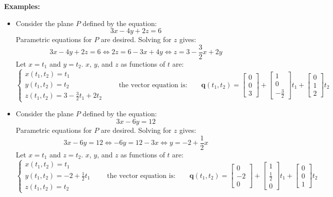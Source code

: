 \documentclass{article}
\begin{document}
\textbf{Examples:}
\begin{itemize}
\item Consider the plane \(P\) defined by the equation:
\[3x - 4y + 2z = 6\]
Parametric equations for \(P\) are desired. 
Solving for \(z\) gives:
\[3x - 4y + 2z = 6 \iff 2z = 6 - 3x + 4y \iff z = 3 - \frac{3}{2}x + 2y\]    
Let \(x = t_1\) and \(y = t_2\). \(x\), \(y\), and \(z\) as functions of \(t\) are:
\[\left\{\begin{array}{c}
x(t_1, t_2) = t_1 \\ 
y(t_1, t_2) = t_2 \\ 
z(t_1, t_2) = 3 - \frac{3}{2}t_1 + 2t_2
\end{array}\right.
\quad\quad\text{the vector equation is:}\quad\quad
\mathbf{q}(t_1, t_2) = \begin{bmatrix} 0 \\ 0 \\ 3 \end{bmatrix} + \begin{bmatrix} 1 \\ 0 \\ -\frac{3}{2} \end{bmatrix} t_1 + \begin{bmatrix} 0 \\ 1 \\ 2 \end{bmatrix}t_2\]
\item Consider the plane \(P\) defined by the equation:
\[3x - 6y = 12\]
Parametric equations for \(P\) are desired. 
Solving for \(z\) gives:
\[3x - 6y = 12 \iff -6y = 12 - 3x \iff y = -2 + \frac{1}{2}x\]    
Let \(x = t_1\) and \(z = t_2\). \(x\), \(y\), and \(z\) as functions of \(t\) are:
\[\left\{\begin{array}{c}
x(t_1, t_2) = t_1 \\ 
y(t_1, t_2) = -2 + \frac{1}{2}t_1 \\ 
z(t_1, t_2) = t_2
\end{array}\right.
\quad\quad\text{the vector equation is:}\quad\quad
\mathbf{q}(t_1, t_2) = \begin{bmatrix} 0 \\ -2 \\ 0 \end{bmatrix} + \begin{bmatrix} 1 \\ \frac{1}{2} \\ 0 \end{bmatrix} t_1 + \begin{bmatrix} 0 \\ 0 \\ 1 \end{bmatrix}t_2\]

\end{itemize}
\end{document}
